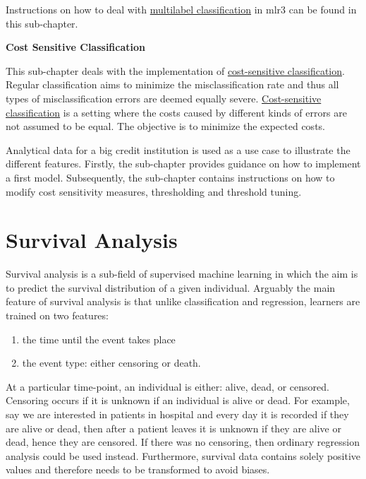 \documentclass[]{scrbook}
\providecommand{\tightlist}{%
  \setlength{\itemsep}{0pt}\setlength{\parskip}{0pt}}
\begin{document}
Instructions on how to deal with \protect\hyperlink{multilabel}{multilabel classification} in mlr3 can be found in this sub-chapter.

\textbf{Cost Sensitive Classification}

This sub-chapter deals with the implementation of \protect\hyperlink{cost-sens}{cost-sensitive classification}.
Regular classification aims to minimize the misclassification rate and thus all types of misclassification errors are deemed equally severe.
\protect\hyperlink{cost-sens}{Cost-sensitive classification} is a setting where the costs caused by different kinds of errors are not assumed to be equal.
The objective is to minimize the expected costs.

Analytical data for a big credit institution is used as a use case to illustrate the different features.
Firstly, the sub-chapter provides guidance on how to implement a first model.
Subsequently, the sub-chapter contains instructions on how to modify cost sensitivity measures, thresholding and threshold tuning.

\hypertarget{survival}{%
\section{Survival Analysis}\label{survival}}

Survival analysis is a sub-field of supervised machine learning in which the aim is to predict the survival distribution of a given individual.
Arguably the main feature of survival analysis is that unlike classification and regression, learners are trained on two features:

\begin{enumerate}
\def\labelenumi{\arabic{enumi}.}
\tightlist
\item
  the time until the event takes place
\item
  the event type: either censoring or death.
\end{enumerate}

At a particular time-point, an individual is either: alive, dead, or censored.
Censoring occurs if it is unknown if an individual is alive or dead.
For example, say we are interested in patients in hospital and every day it is recorded if they are alive or dead, then after a patient leaves it is unknown if they are alive or dead, hence they are censored.
If there was no censoring, then ordinary regression analysis could be used instead.
Furthermore, survival data contains solely positive values and therefore needs to be transformed to avoid biases.
\end{document}
